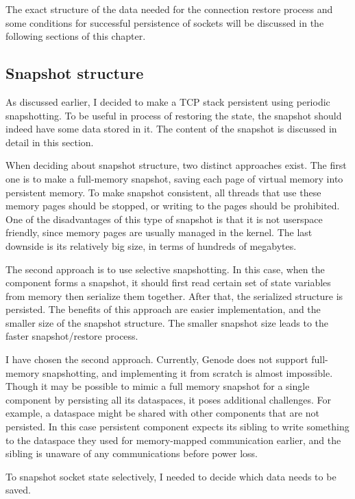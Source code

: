 The exact structure of the data needed for the connection restore process and
some conditions for successful persistence of sockets will be discussed in the
following sections of this chapter.

\subsection{Snapshot structure}

As discussed earlier, I decided to make a TCP stack persistent using periodic
snapshotting.  To be useful in process of restoring the state, the snapshot
should indeed have some data stored in it. The content of the snapshot is
discussed in detail in this section.

When deciding about snapshot structure, two distinct approaches exist. The first one is to make a full-memory snapshot, saving each page of virtual
memory into persistent memory. To make snapshot consistent, all threads that use
these memory pages should be stopped, or writing to the pages should be
prohibited.  One of the disadvantages of this type of snapshot is that it is not userspace
friendly, since memory pages are usually managed in the kernel. The last
downside is its relatively big size, in terms of hundreds of megabytes. 

The second approach is to use selective snapshotting. In this case, when the
component forms a snapshot, it should first read certain set of state variables
from memory then serialize them together. After that, the serialized structure
is persisted. The benefits of this approach are easier implementation, and the
smaller size of the snapshot structure. The smaller snapshot size leads to the faster
snapshot/restore process.

I have chosen the second approach. Currently, Genode does not support
full-memory snapshotting, and implementing it from scratch is almost
impossible. Though it may be possible to mimic a full memory snapshot for a
single component by persisting all its dataspaces, it poses additional
challenges. For example, a dataspace might be shared with other components that
are not persisted. In this case persistent component expects its sibling to
write something to the dataspace they used for memory-mapped communication
earlier, and the sibling is unaware of any communications before power loss.

To snapshot socket state selectively, I needed to decide which data needs
to be saved. 

